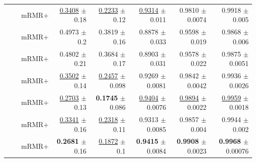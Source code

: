 \begin{longtable}{llp{}rrrrr}
 &  & mRMR+ & \underline{0.3408} {\scriptsize $\pm$ 0.18} & \underline{0.2233} {\scriptsize $\pm$ 0.12} & \underline{0.9314} {\scriptsize $\pm$ 0.011} & 0.9810 {\scriptsize $\pm$ 0.0074} & 0.9918 {\scriptsize $\pm$ 0.005} \\
 &  & mRMR+ & 0.4973 {\scriptsize $\pm$ 0.2} & 0.3819 {\scriptsize $\pm$ 0.16} & 0.8878 {\scriptsize $\pm$ 0.033} & 0.9598 {\scriptsize $\pm$ 0.019} & 0.9868 {\scriptsize $\pm$ 0.006} \\
 &  & mRMR+ & 0.4802 {\scriptsize $\pm$ 0.21} & 0.3684 {\scriptsize $\pm$ 0.17} & 0.8903 {\scriptsize $\pm$ 0.031} & 0.9578 {\scriptsize $\pm$ 0.022} & 0.9875 {\scriptsize $\pm$ 0.0051} \\
 &  & mRMR+ & \underline{0.3502} {\scriptsize $\pm$ 0.14} & \underline{0.2457} {\scriptsize $\pm$ 0.098} & 0.9269 {\scriptsize $\pm$ 0.0081} & 0.9842 {\scriptsize $\pm$ 0.0042} & 0.9936 {\scriptsize $\pm$ 0.0026} \\
 &  & mRMR+ & \underline{0.2703} {\scriptsize $\pm$ 0.13} & \textbf{0.1745} {\scriptsize $\pm$ 0.086} & \underline{0.9404} {\scriptsize $\pm$ 0.0076} & \underline{0.9894} {\scriptsize $\pm$ 0.0022} & \underline{0.9959} {\scriptsize $\pm$ 0.0018} \\
 &  & mRMR+ & \underline{0.3341} {\scriptsize $\pm$ 0.16} & \underline{0.2318} {\scriptsize $\pm$ 0.11} & 0.9313 {\scriptsize $\pm$ 0.0085} & 0.9857 {\scriptsize $\pm$ 0.004} & 0.9944 {\scriptsize $\pm$ 0.002} \\
 &  & mRMR+ & \textbf{0.2681} {\scriptsize $\pm$ 0.16} & \underline{0.1872} {\scriptsize $\pm$ 0.1} & \textbf{0.9415} {\scriptsize $\pm$ 0.0084} & \textbf{0.9908} {\scriptsize $\pm$ 0.0023} & \textbf{0.9968} {\scriptsize $\pm$ 0.00076} \\
\end{longtable}